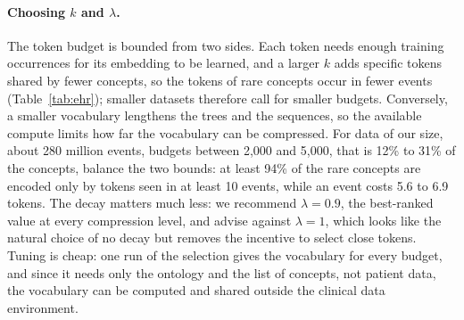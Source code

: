 \paragraph{Choosing $k$ and $\lambda$.}
The token budget is bounded from two sides.
Each token needs enough training occurrences for its embedding to be learned, and a larger $k$ adds specific tokens shared by fewer concepts, so the tokens of rare concepts occur in fewer events (Table~\ref{tab:ehr}); smaller datasets therefore call for smaller budgets.
Conversely, a smaller vocabulary lengthens the trees and the sequences, so the available compute limits how far the vocabulary can be compressed.
For data of our size, about 280 million events, budgets between 2,000 and 5,000, that is 12\% to 31\% of the concepts, balance the two bounds: at least 94\% of the rare concepts are encoded only by tokens seen in at least 10 events, while an event costs 5.6 to 6.9 tokens.
The decay matters much less: we recommend $\lambda = 0.9$, the best-ranked value at every compression level, and advise against $\lambda = 1$, which looks like the natural choice of no decay but removes the incentive to select close tokens.
Tuning is cheap: one run of the selection gives the vocabulary for every budget, and since it needs only the ontology and the list of concepts, not patient data, the vocabulary can be computed and shared outside the clinical data environment.
